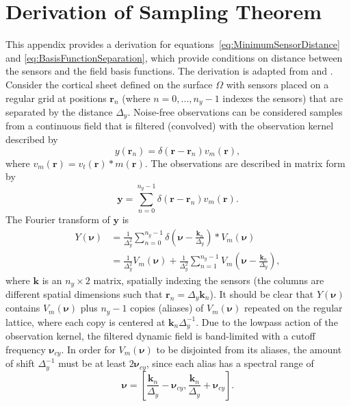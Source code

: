 \documentclass[review,authoryear,3p]{elsarticle}
\begin{document}
\section{Derivation of Sampling Theorem}\label{App:SamplingTheorem}
This appendix provides a derivation for equations~\ref{eq:MinimumSensorDistance} and \ref{eq:BasisFunctionSeparation}, which provide conditions on distance between the sensors and the field basis functions. The derivation is adapted from \citet{Sanner1992} and \citet{Scerri2009}. Consider the cortical sheet defined on the surface $\Omega$ with sensors placed on a regular grid at positions $\mathbf{r}_n$ (where $n=0,...,n_y-1$ indexes the sensors) that are separated by the distance $\Delta_y$. Noise-free observations can be considered samples from a continuous field that is filtered (convolved) with the observation kernel described by
\begin{equation}
	y(\mathbf{r}_n)=\delta(\mathbf r - \mathbf{r}_n ) v_m(\mathbf{r}),
\end{equation} 
where $v_m(\mathbf{r}) = v_t(\mathbf{r})\ast m(\mathbf{r})$. The observations are described in matrix form by
\begin{equation}
	\mathbf y=\sum_{n=0}^{n_y-1}\delta(\mathbf r - \mathbf{r}_n ) v_m(\mathbf{r}).
\end{equation}
The Fourier transform of $\mathbf{y}$ is
\begin{align}
 Y(\boldsymbol{\nu}) &= \frac{1}{\Delta_y^2}\sum_{n=0}^{n_y-1} \delta\left(\boldsymbol{\nu}-\frac{\mathbf{k}_n}{\Delta_y}\right) \ast V_m(\boldsymbol \nu) \\
	&= \frac{1}{\Delta_y^2}V_m(\boldsymbol\nu) + \frac{1}{\Delta_y^2} \sum_{n=1}^{n_y-1} V_m\left(\boldsymbol{\nu}-\frac{\mathbf{k}_n}{\Delta_y}\right),
\end{align} 
where $\mathbf{k}$ is an $n_y \times 2$ matrix, spatially indexing the sensors (the columns are different spatial dimensions such that $\mathbf{r}_n = \Delta_y \mathbf{k}_n$). It should be clear that $Y(\boldsymbol{\nu})$ contains $V_m(\boldsymbol\nu)$ plus $n_y-1$ copies (aliases) of $V_m(\boldsymbol\nu)$ repeated on the regular lattice, where each copy is centered at $\mathbf{k}_n\Delta_y^{-1}$. Due to the lowpass action of the observation kernel, the filtered dynamic field is band-limited with a cutoff frequency $\boldsymbol\nu_{cy}$. In order for $V_m(\boldsymbol\nu)$ to be disjointed from its aliases, the amount of shift $\Delta_y^{-1}$ must be at least $2\boldsymbol\nu_{cy}$, since each alias has a spectral range of
\begin{equation}
	\boldsymbol\nu = \left[\frac{\mathbf{k}_n}{\Delta_y}-\boldsymbol{\nu}_{cy},\frac{\mathbf{k}_n}{\Delta_y}+\boldsymbol{\nu}_{cy}\right].
\end{equation}
\end{document}
